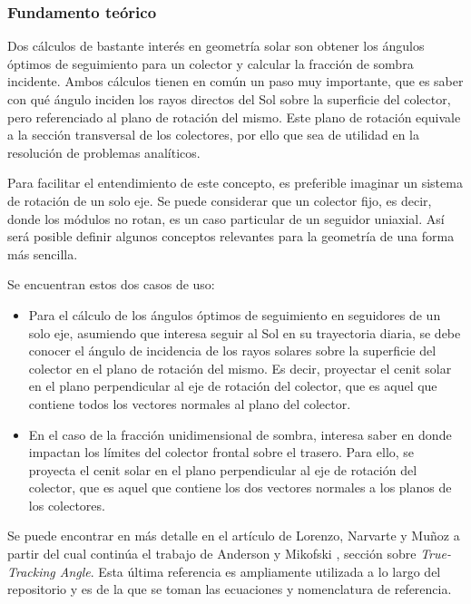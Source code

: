 \subsubsection{Fundamento teórico}

Dos cálculos de bastante interés en geometría solar son obtener los \gls{ángulos óptimos de seguimiento} para un colector y calcular la fracción de \gls{sombra} incidente. Ambos cálculos tienen en común un paso muy importante, que es saber con qué ángulo inciden los rayos directos del Sol sobre la superficie del colector, pero referenciado al plano de rotación del mismo. Este plano de rotación equivale a la sección transversal de los colectores, por ello que sea de utilidad en la resolución de problemas analíticos.

Para facilitar el entendimiento de este concepto, es preferible imaginar un sistema de rotación de un solo eje. Se puede considerar que un colector fijo, es decir, donde los módulos no rotan, es un caso particular de un seguidor uniaxial. Así será posible definir algunos conceptos relevantes para la geometría de una forma más sencilla.

Se encuentran estos dos casos de uso:

\begin{itemize}
    \item Para el cálculo de los \gls{ángulos óptimos de seguimiento} en seguidores de un solo eje, asumiendo que interesa seguir al Sol en su trayectoria diaria, se debe conocer el ángulo de incidencia de los rayos solares sobre la superficie del colector en el plano de rotación del mismo. Es decir, proyectar el cenit solar en el plano perpendicular al eje de rotación del colector, que es aquel que contiene todos los vectores normales al plano del colector.
    \item En el caso de la fracción unidimensional de \gls{sombra}, interesa saber en donde impactan los límites del colector frontal sobre el trasero. Para ello, se proyecta el cenit solar en el plano perpendicular al eje de rotación del colector, que es aquel que contiene los dos vectores normales a los planos de los \gls{colectores}.
\end{itemize}

Se puede encontrar en más detalle en el artículo de Lorenzo, Narvarte y Muñoz \cite{Lorenzo_Narvarte_Muñoz_2011} a partir del cual continúa el trabajo de Anderson y Mikofski \cite{Anderson_Mikofski_2020}, sección sobre \textit{True-Tracking Angle}. Esta última referencia es ampliamente utilizada a lo largo del repositorio y es de la que se toman las ecuaciones y nomenclatura de referencia.

